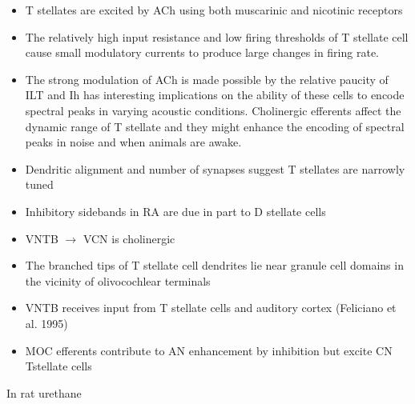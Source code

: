 \documentclass[10pt,a4paper]{article}
\begin{document}
\begin{itemize}
\item T stellates are excited by ACh using both muscarinic and nicotinic
  receptors
\item The relatively high input resistance and low firing thresholds of T
  stellate cell cause small modulatory currents to produce large changes in
  firing rate.
\item The strong modulation of ACh is made possible by the relative paucity of
  ILT and Ih has interesting implications on the ability of these cells to
  encode spectral peaks in varying acoustic conditions.  Cholinergic efferents
  affect the dynamic range of T stellate and they might enhance the encoding of
  spectral peaks in noise and when animals are awake.
\item Dendritic alignment and number of synapses suggest T stellates are
  narrowly tuned
\item Inhibitory sidebands in RA are due in part to D stellate cells
\item VNTB \ensuremath{\rightarrow} VCN is cholinergic  \citep{SherriffHenderson:1994}
\item The branched tips of T stellate cell dendrites lie near granule cell
  domains in the vicinity of olivocochlear terminals
  \citep{OertelFujino:2001,OertelWuEtAl:1990}
\item VNTB receives input from T stellate cells
  \citep{SmithJorisEtAl:1993,ThompsonThompson:1991} and auditory cortex
  (Feliciano et al. 1995)
\item MOC efferents contribute to AN enhancement by inhibition but excite CN
  Tstellate cells
\end{itemize}
In rat urethane \citep{EbertOstwald:1995}
\end{document}
